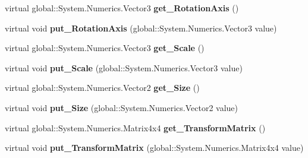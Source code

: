 \begin{DoxyCompactItemize}
\item 
\mbox{\label{class_windows_1_1_u_i_1_1_composition_1_1_visual_ae2a10f0e80dbd715f4a46226c4e1c6c0}} 
virtual global\+::\+System.\+Numerics.\+Vector3 {\bfseries get\+\_\+\+Rotation\+Axis} ()
\item 
\mbox{\label{class_windows_1_1_u_i_1_1_composition_1_1_visual_a7205a644c2e54e0465bfc32dff2ba814}} 
virtual void {\bfseries put\+\_\+\+Rotation\+Axis} (global\+::\+System.\+Numerics.\+Vector3 value)
\item 
\mbox{\label{class_windows_1_1_u_i_1_1_composition_1_1_visual_a35b342e278a4e2eee8f7e447d88c1043}} 
virtual global\+::\+System.\+Numerics.\+Vector3 {\bfseries get\+\_\+\+Scale} ()
\item 
\mbox{\label{class_windows_1_1_u_i_1_1_composition_1_1_visual_a7d09090c17f01920bb97e02f119cc78f}} 
virtual void {\bfseries put\+\_\+\+Scale} (global\+::\+System.\+Numerics.\+Vector3 value)
\item 
\mbox{\label{class_windows_1_1_u_i_1_1_composition_1_1_visual_aac55aa21f6e472aab4a33831d9e4ea2a}} 
virtual global\+::\+System.\+Numerics.\+Vector2 {\bfseries get\+\_\+\+Size} ()
\item 
\mbox{\label{class_windows_1_1_u_i_1_1_composition_1_1_visual_a00b77bc75500670531a48399d03ffe1d}} 
virtual void {\bfseries put\+\_\+\+Size} (global\+::\+System.\+Numerics.\+Vector2 value)
\item 
\mbox{\label{class_windows_1_1_u_i_1_1_composition_1_1_visual_a8c23adab99bc95b5ccbf93a75ed76265}} 
virtual global\+::\+System.\+Numerics.\+Matrix4x4 {\bfseries get\+\_\+\+Transform\+Matrix} ()
\item 
\mbox{\label{class_windows_1_1_u_i_1_1_composition_1_1_visual_a2689ab7c32a3c7a5d1978aa89a514762}} 
virtual void {\bfseries put\+\_\+\+Transform\+Matrix} (global\+::\+System.\+Numerics.\+Matrix4x4 value)

\end{DoxyCompactItemize}
